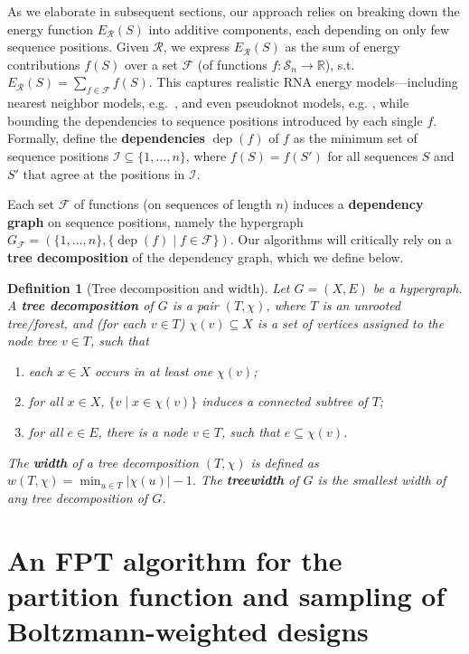 \documentclass{bioinfo}
\newtheorem{definition}[theorem]{Definition}
\newcommand{\dep}{\operatorname{dep}}
\newcommand{\real}{\mathbb{R}}
\newcommand{\F}{\mathcal{F}}
\newcommand{\I}{\mathcal{I}}
\newcommand{\R}{\mathcal{R}}
\renewcommand{\S}{\mathcal{S}}
\newcommand{\width}{w}
\newcommand{\Def}[1]{{\bfseries #1}}
\begin{document}
%
  As we elaborate in subsequent sections, our approach relies on
  breaking down the energy function $E_\R(S)$ into additive
  components, each depending on only few sequence positions. Given
  $\R$, we express $E_\R(S)$ as the sum of energy contributions $f(S)$
  over a set $\F$ (of functions $f:\S_n\to\real$),
  s.t.~$E_\R(S)=\sum_{f\in\F} f(S)$. This captures realistic RNA
  energy models---including nearest neighbor models,
  e.g.~\citet{Turner2009}, and even pseudoknot models,
  e.g. \citet{Andronescu2010}, while bounding the dependencies to
  sequence positions introduced by each single $f$. Formally, define
  the \Def{dependencies} $\dep(f)$ of $f$ as the minimum set of sequence
  positions $\I\subseteq\{1,\dots,n\}$, where $f(S)=f(S')$ for all
  sequences $S$ and $S'$ that agree at the positions in $\I$.

  Each set $\F$ of functions (on sequences of length $n$) induces a
  \Def{dependency graph} on sequence positions, namely the hypergraph
  $G_\F=(\{1,\dots,n\} ,\{\dep(f)\mid f\in \F\})$.  Our algorithms
  will critically rely on a \Def{tree decomposition} of the dependency
  graph, which we define below.
\begin{definition}[Tree decomposition and width]
  \label{def:treedecomp}
  Let $G=(X, E)$ be a hypergraph. A \Def{tree decomposition} of $G$ is
  a pair $(T,\chi)$, where $T$ is an unrooted tree/forest, and (for
  each $v\in T$) $\chi(v)\subseteq X$ is a set of vertices assigned to
  the node tree $v\in T$, such that
\begin{enumerate}
\item each $x\in X$ occurs in at least one $\chi(v)$;
\item for all $x\in X$, $\{ v \mid x \in \chi(v) \}$ induces a connected subtree of $T$;
\item for all $e\in E$, there is a node $v\in T$, such that $e\subseteq\chi(v)$.
\end{enumerate}
The \Def{width} of a tree decomposition $(T,\chi)$ is defined as
$\width(T,\chi) = \min_{u\in T} |\chi(u)| - 1 $. The \Def{treewidth}
of $G$ is the smallest width of any tree decomposition of $G$.
\end{definition}


\section{An FPT algorithm for the partition function and sampling of Boltzmann-weighted designs}
\label{sec:FPT}
\end{document}
